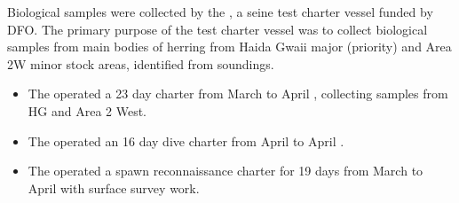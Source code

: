 Biological samples were collected by the ,
a seine test charter vessel funded by DFO.
The primary purpose of the test charter vessel was to
collect biological samples from main bodies of herring from
Haida Gwaii major (priority) and Area 2W minor stock areas,
identified from soundings.

\begin{itemize}

\item The  operated a 23 day charter
from March  to April , collecting samples from HG and Area 2 West.

\item The  operated an 16 day
dive charter from April  to April .

\item The  operated a spawn reconnaissance charter
for 19 days from March  to April  with surface survey work.

\end{itemize}
